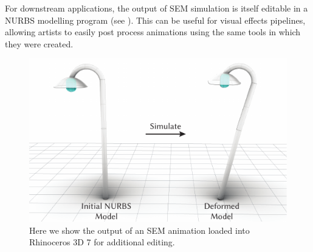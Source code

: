 

For downstream applications, the output of  SEM simulation is itself editable in a NURBS modelling program (see ). 
This can be useful for visual effects pipelines, allowing artists to easily post process animations using the same tools in which they were created.
\begin{figure}[h]
  \includegraphics[width=\columnwidth]{figures/export_iges.pdf}
  \caption{Here we show the output of an SEM animation loaded into Rhinoceros 3D 7 for additional editing.}
  \label{fig:edit}
\end{figure}

